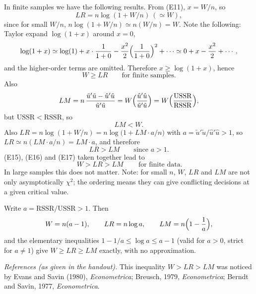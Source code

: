 \documentclass[11pt]{article}
\begin{document}
In finite samples we have the following results. From (E11), $x=W/n$, so
\begin{equation}\tag{E14}
 LR=n\log(1+W/n)\ (\simeq W),
\end{equation}
since for small $W/n$, $n\log(1+W/n)\simeq n(W/n)=W$. Note the following: Taylor expand $\log(1+x)$
around $x=0$,
\[ \log(1+x)\simeq\log(1)+x\cdot\frac1{1+0}-\frac{x^{2}}2\Bigl(\frac1{1+0}\Bigr)^{2}+\cdots
   \simeq 0+x-\frac{x^{2}}2+\cdots, \]
and the higher-order terms are omitted. Therefore $x\ge\log(1+x)$, hence
\begin{equation}\tag{E15}
 W\ge LR\qquad\text{for finite samples.}
\end{equation}
Also
\[ LM=n\,\frac{\tilde u'\tilde u-\hat u'\hat u}{\tilde u'\tilde u}
   =W\Bigl(\frac{\hat u'\hat u}{\tilde u'\tilde u}\Bigr)=W\Bigl(\frac{\mathrm{USSR}}{\mathrm{RSSR}}\Bigr), \]
but $\mathrm{USSR}<\mathrm{RSSR}$, so
\begin{equation}\tag{E16}
 LM<W.
\end{equation}
Also $LR=n\log(1+W/n)=n\log\bigl(1+LM\cdot a/n\bigr)$ with $a=\tilde u'\tilde u/\hat u'\hat u>1$, so
$LR\simeq n(LM\cdot a/n)=LM\cdot a$, and therefore
\begin{equation}\tag{E17}
 LR>LM\qquad\text{since }a>1.
\end{equation}
(E15), (E16) and (E17) taken together lead to
\[ \boxed{\,W>LR>LM\,}\qquad\text{for finite data.} \]
In large samples this does not matter. Note: for small $n$, $W$, $LR$ and $LM$ are not only
asymptotically $\chi^{2}$; the ordering means they can give conflicting decisions at a given critical
value.

Write $a=\mathrm{RSSR}/\mathrm{USSR}>1$. Then
\[ W=n(a-1),\qquad LR=n\log a,\qquad LM=n\Bigl(1-\frac1a\Bigr), \]
and the elementary inequalities $1-1/a\le\log a\le a-1$ (valid for $a>0$, strict for $a\neq1$) give
$W\ge LR\ge LM$ exactly, with no approximation.

\emph{References (as given in the handout).} This inequality $W>LR>LM$ was noticed by Evans and Savin
(1980), \emph{Econometrica}; Breusch, 1979, \emph{Econometrica}; Berndt and Savin, 1977, \emph{Econometrica}.
\end{document}
